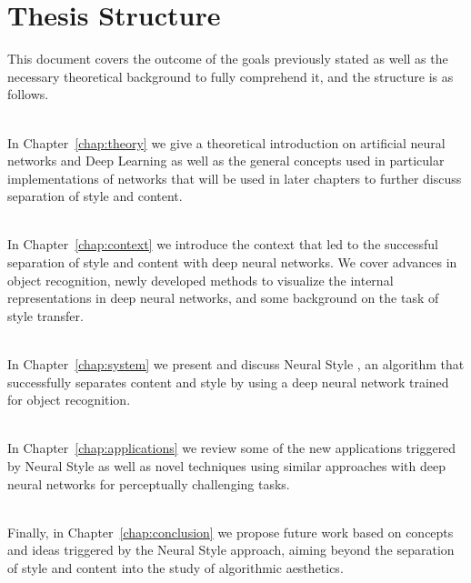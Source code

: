 
\section{Thesis Structure}
\label{sec:intro:structure}

This document covers the outcome of the goals previously stated as well as the necessary theoretical background to fully comprehend it, and the structure is as follows.

\begin{minipage}{\textwidth}
  \textbf{} \\[0.2em]
  In Chapter~\ref{chap:theory} we give a theoretical introduction on artificial neural networks and Deep Learning as well as the general concepts used in particular implementations of networks that will be used in later chapters to further discuss separation of style and content.
\end{minipage}

\begin{minipage}{\textwidth}
  \textbf{} \\[0.2em]
  In Chapter~\ref{chap:context} we introduce the context that led to the successful separation of style and content with deep neural networks. We cover advances in object recognition, newly developed methods to visualize the internal representations in deep neural networks, and some background on the task of style transfer.
\end{minipage}

\begin{minipage}{\textwidth}
  \textbf{} \\[0.2em]
  In Chapter~\ref{chap:system} we present and discuss Neural Style \cite{Gatys2015B}, an algorithm that successfully separates content and style by using a deep neural network trained for object recognition.
\end{minipage}

\begin{minipage}{\textwidth}
  \textbf{} \\[0.2em]
  In Chapter~\ref{chap:applications} we review some of the new applications triggered by Neural Style as well as novel techniques using similar approaches with deep neural networks for perceptually challenging tasks.
\end{minipage}

\begin{minipage}{\textwidth}
  \textbf{} \\[0.2em]
  Finally, in Chapter~\ref{chap:conclusion} we propose future work based on concepts and ideas triggered by the Neural Style approach, aiming beyond the separation of style and content into the study of algorithmic aesthetics.
\end{minipage}
